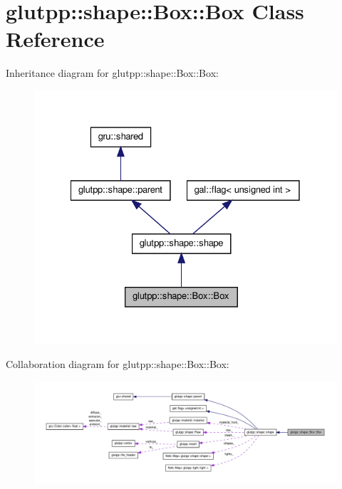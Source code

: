 \hypertarget{classglutpp_1_1shape_1_1Box_1_1Box}{\section{glutpp\-:\-:shape\-:\-:\-Box\-:\-:\-Box \-Class \-Reference}
\label{classglutpp_1_1shape_1_1Box_1_1Box}
}


\-Inheritance diagram for glutpp\-:\-:shape\-:\-:\-Box\-:\-:\-Box\-:\nopagebreak
\begin{figure}[H]
\begin{center}
\leavevmode
\includegraphics[width=328pt]{classglutpp_1_1shape_1_1Box_1_1Box__inherit__graph}
\end{center}
\end{figure}


\-Collaboration diagram for glutpp\-:\-:shape\-:\-:\-Box\-:\-:\-Box\-:\nopagebreak
\begin{figure}[H]
\begin{center}
\leavevmode
\includegraphics[width=350pt]{classglutpp_1_1shape_1_1Box_1_1Box__coll__graph}
\end{center}
\end{figure}
